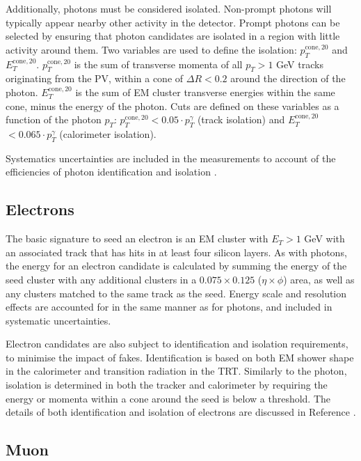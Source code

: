 \newcommand\ptcone{$p_T^{\text{cone},20}$\xspace}
\newcommand\etcone{$E_T^{\text{cone},20}$\xspace}
Additionally, photons must be considered isolated. Non-prompt photons will
typically appear nearby other activity in the detector. Prompt photons can be
selected by ensuring that photon candidates are isolated in a region with little
activity around them. Two variables are used to define the isolation:
\ptcone and \etcone.
\ptcone is the sum of transverse momenta of all $p_T > 1$ GeV tracks originating from the
\ac{PV}, within a cone of $\Delta R < 0.2$ around the direction of the photon.
\etcone is the sum of \ac{EM} cluster transverse energies within the same cone,
minus the energy of the photon.
Cuts are defined on these variables as a function of the photon $p_T$:
\ptcone $<0.05\cdot p_T^\gamma$ (track isolation) and \etcone $<0.065\cdot
p_T^\gamma$ (calorimeter isolation).

Systematics uncertainties are included in the measurements to account of the efficiencies of photon
identification and isolation \cite{PhotonIDIsoEff2016}.


\subsection{Electrons}

The basic signature to seed an electron is an \ac{EM} cluster with $E_T>1$ GeV
with an associated track that has hits in at least four silicon layers. As with
photons, the energy for an electron candidate is calculated by summing the
energy of the seed cluster with any additional clusters in a $0.075\times0.125$
($\eta\times\phi$) area, as well as any clusters matched to the same track as
the seed. Energy scale and resolution effects are accounted for in the same
manner as for photons, and included in systematic uncertainties.

Electron candidates are also subject to identification and isolation
requirements, to minimise the impact of fakes. Identification is based on both
\ac{EM} shower shape in the calorimeter and transition radiation in the
\ac{TRT}. Similarly to the photon, isolation is determined in both the tracker
and calorimeter by requiring the energy or momenta within a cone around the seed
is below a threshold. The details of both identification and isolation of
electrons are discussed in Reference \cite{ElectronIDIso2019}.


\subsection{Muon}

